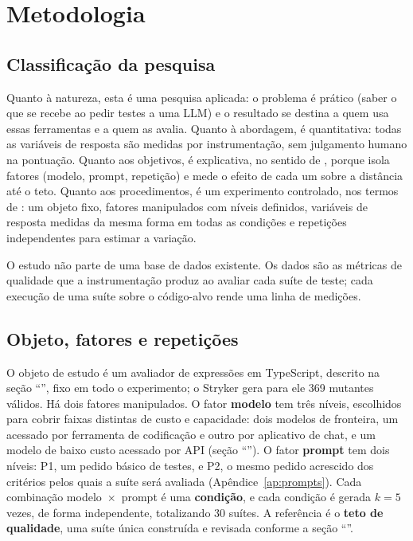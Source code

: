 \chapter{Metodologia}
\label{cap:metodologia}

\section{Classificação da pesquisa}

Quanto à natureza, esta é uma pesquisa aplicada: o problema é prático (saber o que se recebe ao pedir testes a uma LLM) e o resultado se destina a quem usa essas ferramentas e a quem as avalia. Quanto à abordagem, é quantitativa: todas as variáveis de resposta são medidas por instrumentação, sem julgamento humano na pontuação. Quanto aos objetivos, é explicativa, no sentido de , porque isola fatores (modelo, prompt, repetição) e mede o efeito de cada um sobre a distância até o teto. Quanto aos procedimentos, é um experimento controlado, nos termos de : um objeto fixo, fatores manipulados com níveis definidos, variáveis de resposta medidas da mesma forma em todas as condições e repetições independentes para estimar a variação.

O estudo não parte de uma base de dados existente. Os dados são as métricas de qualidade que a instrumentação produz ao avaliar cada suíte de teste; cada execução de uma suíte sobre o código-alvo rende uma linha de medições.

\section{Objeto, fatores e repetições}

O objeto de estudo é um avaliador de expressões em TypeScript, descrito na seção ``'', fixo em todo o experimento; o Stryker gera para ele 369 mutantes válidos. Há dois fatores manipulados. O fator \textbf{modelo} tem três níveis, escolhidos para cobrir faixas distintas de custo e capacidade: dois modelos de fronteira, um acessado por ferramenta de codificação e outro por aplicativo de chat, e um modelo de baixo custo acessado por API (seção ``''). O fator \textbf{prompt} tem dois níveis: P1, um pedido básico de testes, e P2, o mesmo pedido acrescido dos critérios pelos quais a suíte será avaliada (Apêndice~\ref{ap:prompts}). Cada combinação modelo~$\times$~prompt é uma \textbf{condição}, e cada condição é gerada $k = 5$ vezes, de forma independente, totalizando 30 suítes. A referência é o \textbf{teto de qualidade}, uma suíte única construída e revisada conforme a seção ``''.

